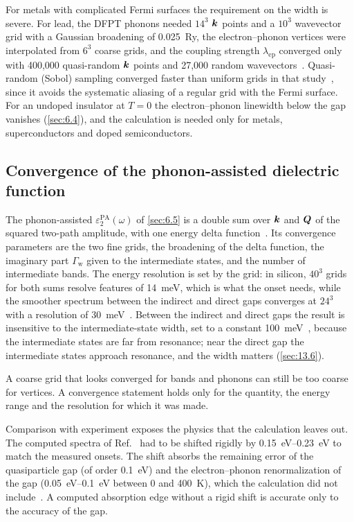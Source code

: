 For metals with complicated Fermi surfaces the requirement on the width is severe. For lead, the DFPT phonons needed $14^3$ $\bm{k}$ points and a $10^3$ wavevector grid with a Gaussian broadening of \SI{0.025}{Ry}, the electron--phonon vertices were interpolated from $6^3$ coarse grids, and the coupling strength $\lambda_{\mathrm{ep}}$ converged only with 400{,}000 quasi-random $\bm{k}$ points and 27{,}000 random wavevectors~\cite[Fig.~12]{ponce2016epw}. Quasi-random (Sobol) sampling converged faster than uniform grids in that study~\cite{ponce2016epw}, since it avoids the systematic aliasing of a regular grid with the Fermi surface. For an undoped insulator at $T = 0$ the electron--phonon linewidth below the gap vanishes (\cref{sec:6.4}), and the calculation is needed only for metals, superconductors and doped semiconductors.

\subsection{Convergence of the phonon-assisted dielectric function}

The phonon-assisted $\varepsilon_2^{\mathrm{PA}}(\omega)$ of \cref{sec:6.5} is a double sum over $\bm{k}$ and $\bm{Q}$ of the squared two-path amplitude, with one energy delta function~\cite[Eqs.~(1)--(3)]{noffsinger2012phonon}. Its convergence parameters are the two fine grids, the broadening of the delta function, the imaginary part $\varGamma_{\mathrm{w}}$ given to the intermediate states, and the number of intermediate bands. The energy resolution is set by the grid: in silicon, $40^3$ grids for both sums resolve features of \SI{14}{meV}, which is what the onset needs, while the smoother spectrum between the indirect and direct gaps converges at $24^3$ with a resolution of \SI{30}{meV}~\cite{noffsinger2012phonon}. Between the indirect and direct gaps the result is insensitive to the intermediate-state width, set to a constant \SI{100}{meV}~\cite{noffsinger2012phonon}, because the intermediate states are far from resonance; near the direct gap the intermediate states approach resonance, and the width matters (\cref{sec:13.6}).

A coarse grid that looks converged for bands and phonons can still be too coarse for vertices. A convergence statement holds only for the quantity, the energy range and the resolution for which it was made.

Comparison with experiment exposes the physics that the calculation leaves out. The computed spectra of Ref.~\cite{noffsinger2012phonon} had to be shifted rigidly by \SIrange{0.15}{0.23}{eV} to match the measured onsets. The shift absorbs the remaining error of the quasiparticle gap (of order \SI{0.1}{eV}) and the electron--phonon renormalization of the gap (\SIrange{0.05}{0.1}{eV} between 0 and \SI{400}{K}), which the calculation did not include~\cite{noffsinger2012phonon}. A computed absorption edge without a rigid shift is accurate only to the accuracy of the gap.

